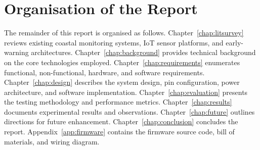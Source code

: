 \section{Organisation of the Report}

The remainder of this report is organised as follows.
Chapter~\ref{chap:litsurvey} reviews existing coastal monitoring systems, IoT sensor
platforms, and early-warning architectures.
Chapter~\ref{chap:background} provides technical background on the core technologies
employed.
Chapter~\ref{chap:requirements} enumerates functional, non-functional, hardware, and
software requirements.
Chapter~\ref{chap:design} describes the system design, pin configuration, power
architecture, and software implementation.
Chapter~\ref{chap:evaluation} presents the testing methodology and performance metrics.
Chapter~\ref{chap:results} documents experimental results and observations.
Chapter~\ref{chap:future} outlines directions for future enhancement.
Chapter~\ref{chap:conclusion} concludes the report.
Appendix~\ref{app:firmware} contains the firmware source code, bill of materials, and
wiring diagram.
